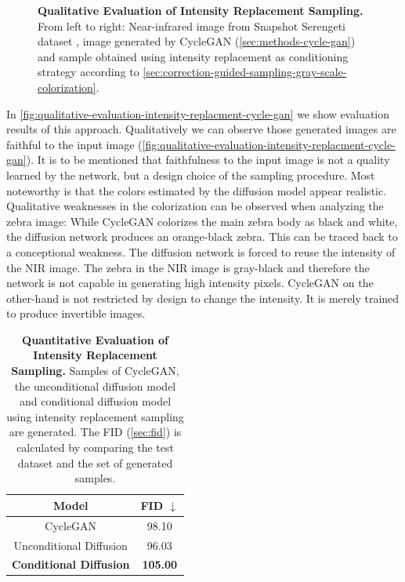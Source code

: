 \begin{figure}[htp!]
\begin{tabularx}{\textwidth}{Y Y Y !{\space} Y Y Y}
    \end{tabularx}
    \caption{
        \textbf{Qualitative Evaluation of Intensity Replacement Sampling.}
        From left to right:
        Near-infrared image from Snapshot Serengeti dataset \parencite{serengeti},
        image generated by CycleGAN (\autoref{sec:methods-cycle-gan})\parencite{mehri}
        and
        sample obtained using intensity replacement as conditioning strategy according to \autoref{sec:correction-guided-sampling-gray-scale-colorization}.
    }
    \label{fig:qualitative-evaluation-intensity-replacment-cycle-gan}
\end{figure}

In \autoref{fig:qualitative-evaluation-intensity-replacment-cycle-gan} we show evaluation results of this approach.
Qualitatively we can observe those generated images are faithful to the input image (\autoref{fig:qualitative-evaluation-intensity-replacment-cycle-gan}).
It is to be mentioned that faithfulness to the input image is not a quality learned by the network, but a design choice of the sampling procedure.
Most noteworthy is that the colors estimated by the diffusion model appear realistic.
Qualitative weaknesses in the colorization can be observed when analyzing the zebra image:
While CycleGAN colorizes the main zebra body as black and white, the diffusion network produces an orange-black zebra.
This can be traced back to a conceptional weakness.
The diffusion network is forced to reuse the intensity of the NIR image.
The zebra in the NIR image is gray-black and therefore the network is not capable in generating high intensity pixels.
CycleGAN on the other-hand is not restricted by design to change the intensity.
It is merely trained to produce invertible images.

\begin{table}[htp!]
    \centering
    \begin{tabular}{c | c}
        Model                                           & FID  $\downarrow$ \\
        \hline\hline
        CycleGAN                                        & 98.10             \\
        Unconditional Diffusion                         & 96.03             \\
        \textbf{Conditional Diffusion} \parencite{sbgm} & \textbf{105.00}
    \end{tabular}
    \caption{
        \textbf{Quantitative Evaluation of Intensity Replacement Sampling.}
        Samples of CycleGAN, the unconditional diffusion model and conditional diffusion model using intensity replacement sampling are generated.
        The FID (\autoref{sec:fid}) \parencite{ttur} is calculated by comparing the test dataset and the set of generated samples.
    }
    \label{fig:quantitative-evaluation-intensity-replacment-cycle-gan}
\end{table}


